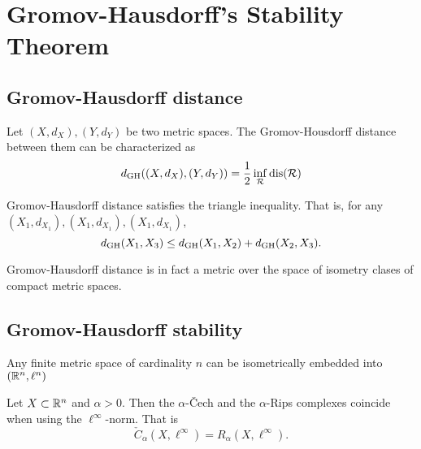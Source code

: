 \chapter{Gromov-Hausdorff's Stability Theorem}

\section{Gromov-Hausdorff distance}

\begin{definition}
    
\end{definition}

\begin{definition}
    
\end{definition}

\begin{proposition}
    Let $ (X, d_X), (Y, d_Y) $ be two metric spaces. The Gromov-Housdorff distance between them can be characterized as
    $$
        d_{\operatorname{GH}}((X, d_X), (Y, d_Y)) = \frac{1}{2} \inf_{\mathcal R} \operatorname{dis}(\mathcal R)
    $$  
\end{proposition}

\begin{lemma}
    Gromov-Hausdorff distance satisfies the triangle inequality. That is, for any $ (X_1, d_{X_1}), (X_1, d_{X_1}), (X_1, d_{X_1}) $,
    $$
        d_{\operatorname{GH}}(X_1, X_3) \leq d_{\operatorname{GH}}(X_1, X_2) + d_{\operatorname{GH}}(X_2, X_3).
    $$
\end{lemma}

\begin{theorem}
    Gromov-Hausdorff distance is in fact a metric over the space of isometry clases of compact metric spaces.    
\end{theorem}

\section{Gromov-Hausdorff stability}
\begin{lemma}
    Any finite metric space of cardinality $ n $ can be isometrically embedded into $(\mathbb R^n, \ell^n)$
\end{lemma}

\begin{lemma}
    Let $ X \subset \mathbb R^n $ and $ \alpha > 0 $. Then the $\alpha$-\v Cech and the $\alpha$-Rips complexes coincide when using the $ \ell^\infty $-norm. That is
    $$
        \check C_\alpha(X, \ell^\infty) = R_\alpha(X, \ell^\infty).
    $$
\end{lemma}

